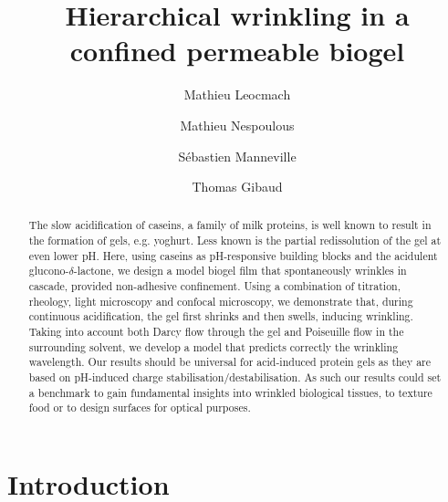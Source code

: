 \documentclass[twocolumn,superscriptaddress,showpacs,preprintnumbers,
amsmath,amssymb,prl]{revtex4-1}
\begin{document}
\title{Hierarchical wrinkling in a confined permeable biogel}
\author{Mathieu Leocmach}
\author{Mathieu Nespoulous}
\author{Sébastien Manneville}
\author{Thomas Gibaud}

\begin{abstract}
The slow acidification of caseins, a family of milk proteins, is well known to result in the formation of gels, e.g. yoghurt. Less known is the partial redissolution of the gel at even lower pH. Here, using caseins as pH-responsive building blocks and the acidulent glucono-$\delta$-lactone, we design a model biogel film that spontaneously wrinkles in cascade, provided non-adhesive confinement. Using a combination of titration, rheology, light microscopy and confocal microscopy, we demonstrate that, during continuous acidification, the gel first shrinks and then swells, inducing wrinkling. Taking into account both Darcy flow through the gel and Poiseuille flow in the surrounding solvent, we develop a model that predicts correctly the wrinkling wavelength. Our results should be universal for acid-induced protein gels as they are based on pH-induced charge stabilisation/destabilisation. As such our results could set a benchmark to gain fundamental insights into wrinkled biological tissues, to texture food or to design surfaces for optical purposes.
\end{abstract}

\maketitle

\section*{Introduction}
\end{document}
